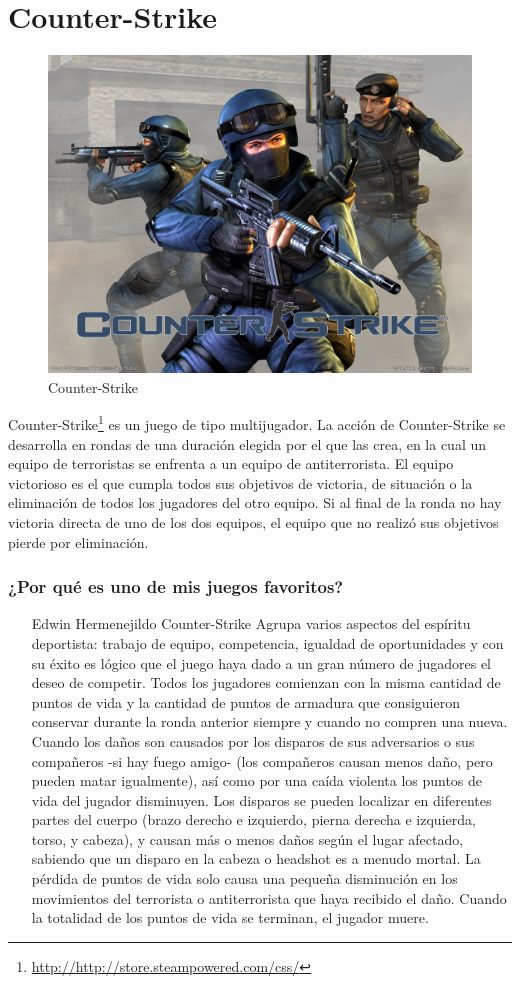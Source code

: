 \section{Counter-Strike}

\begin{figure}[htbp]
\begin{center}
\includegraphics[width=.60\textwidth]{./imagenes/CounterStrike.jpg}
\caption{Counter-Strike}
\label{Counter-Strike}
\end{center}
\end{figure}
Counter-Strike\footnote{\url{http://http://store.steampowered.com/css/}} es un juego de tipo multijugador. La acción de Counter-Strike se desarrolla en rondas de una duración elegida por el que las crea, en la cual un equipo de terroristas se enfrenta a un equipo de antiterrorista. El equipo victorioso es el que cumpla todos sus objetivos de victoria, de situación o la eliminación de todos los jugadores del otro equipo. Si al final de la ronda no hay victoria directa de uno de los dos equipos, el equipo que no realizó sus objetivos pierde por eliminación.

\subsubsection{¿Por qué es uno de mis juegos favoritos?}
\begin{itemize}
\item[Edwin Hermenejildo] Counter-Strike Agrupa varios aspectos del espíritu deportista: trabajo de equipo, competencia, igualdad de oportunidades y con su éxito es lógico que el juego haya dado a un gran número de jugadores el deseo de competir.
Todos los jugadores comienzan con la misma cantidad de puntos de vida y la cantidad de puntos de armadura que consiguieron conservar durante la ronda anterior siempre y cuando no compren una nueva. Cuando los daños son causados por los disparos de sus adversarios o sus compañeros -si hay fuego amigo- (los compañeros causan menos daño, pero pueden matar igualmente), así como por una caída violenta los puntos de vida del jugador disminuyen. Los disparos se pueden localizar en diferentes partes del cuerpo (brazo derecho e izquierdo, pierna derecha e izquierda, torso, y cabeza), y causan más o menos daños según el lugar afectado, sabiendo que un disparo en la cabeza o headshot es a menudo mortal. La pérdida de puntos de vida solo causa una pequeña disminución en los movimientos del terrorista o antiterrorista que haya recibido el daño. Cuando la totalidad de los puntos de vida se terminan, el jugador muere.
\end{itemize}
